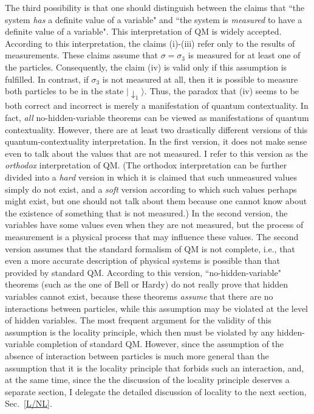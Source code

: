 \documentclass[12pt]{article}
\begin{document}
The third possibility is that one should distinguish between 
the claims that ``the system {\em has} a definite value of a variable" 
and ``the system is {\em measured} to have a definite value of a variable".
This interpretation of QM is widely accepted. According to this 
interpretation, the claims (i)-(iii) refer only to the results of 
measurements. These claims assume that $\sigma=\sigma_3$ is measured 
for at least one of the particles. Consequently, the claim 
(iv) is valid only if this assumption is fulfilled. In contrast, 
if $\sigma_3$ is not measured at all, then it is possible to measure 
both particles to be in the state $|\!\downarrow_1\rangle$.
Thus, the paradox that (iv) seems to be both correct and incorrect 
is merely a manifestation of quantum contextuality. 
In fact, {\em all} no-hidden-variable theorems can be viewed 
as manifestations of quantum contextuality. 
However, there are at least two drastically different versions of this
quantum-contextuality interpretation. 
In the first version, it does not make sense even to talk about 
the values that are not measured. I refer to this version 
as the {\em orthodox} interpretation of QM. (The orthodox 
interpretation can be further divided into a {\em hard} version 
in which it is claimed that such unmeasured values simply
do not exist, and a {\em soft} version according to which
such values perhaps might exist, but  
one should not talk about them because one cannot know about the 
existence of something that is not measured.)
In the second version, the variables have some values even 
when they are not measured, but the process of measurement is a 
physical process that may influence these values. The second 
version assumes that the standard formalism of QM is not complete, 
i.e., that even a more accurate description of physical systems 
is possible than that provided by standard QM. According to this version, 
``no-hidden-variable" theorems (such as the one of Bell or Hardy)
do not really prove that hidden variables cannot exist, because
these theorems {\em assume} that there are no interactions 
between particles, while this assumption may be violated  
at the level of hidden variables. 
%
The most frequent argument for the validity of this assumption
is the locality principle, which then must be violated 
by any hidden-variable completion of standard QM.
However, since the assumption of the absence of interaction 
between particles is much more general than the assumption
that it is the locality principle that forbids 
such an interaction, and, at the same time, since the 
the discussion of the locality principle deserves 
a separate section, I delegate the detailed discussion of 
locality to the next section, Sec.~\ref{L/NL}. 
%
\end{document}

